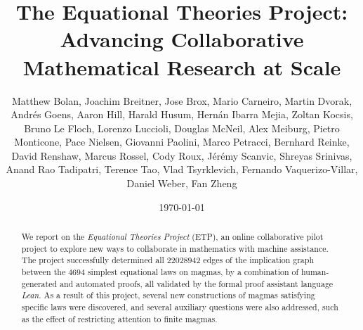 \documentclass[12pt]{amsart}
\title[Equational Theories Project]{The Equational Theories Project: Advancing Collaborative Mathematical Research at Scale}
\author[Equational Theories Project contributors]{Matthew Bolan, Joachim Breitner, Jose Brox, Mario Carneiro,
  Martin Dvorak, Andr\'es Goens, Aaron Hill, Harald Husum, Hern\'an Ibarra Mejia, Zoltan Kocsis, Bruno Le Floch, Lorenzo Luccioli, Douglas McNeil,
  Alex Meiburg, Pietro Monticone, Pace Nielsen, Giovanni Paolini, Marco Petracci, Bernhard Reinke, David Renshaw, Marcus Rossel, Cody Roux,
  J\'er\'emy Scanvic, Shreyas Srinivas, Anand Rao Tadipatri, Terence Tao, Vlad Tsyrklevich, Fernando Vaquerizo-Villar,
  Daniel Weber, Fan Zheng}
\date{\today}
\theoremstyle{definition}
\begin{document}
\begin{abstract}
  We report on the \emph{Equational Theories Project} (ETP), an online collaborative pilot project
  to explore new ways to collaborate in mathematics with machine assistance. The project successfully determined all $\num{22028942}$ edges of the implication graph between the $4694$ simplest equational laws on magmas, by a combination of
  human-generated and automated proofs, all validated by the formal proof assistant language
  \emph{Lean}. As a result of this project, several new constructions of magmas satisfying specific laws were discovered, and several auxiliary questions were also addressed, such as the effect of restricting attention to finite magmas.
\end{abstract}

\begingroup
\def\uppercasenonmath#1{} %
\let\MakeUppercase\relax %
\maketitle
\endgroup

{
\setlength{\parskip}{0em}
\setcounter{tocdepth}{1}
\tableofcontents
}








% 







\appendix
{}





\end{document}
